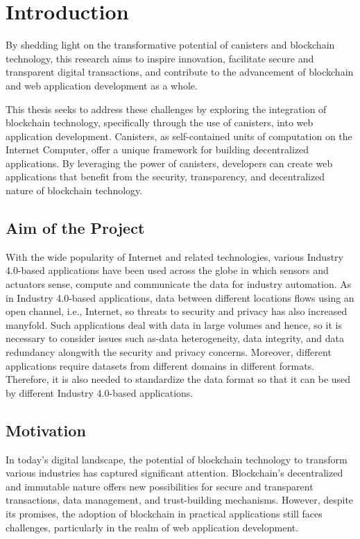\chapter{Introduction}
\label{chap:intro}

By shedding light on the transformative potential of canisters and blockchain technology, this research aims to inspire innovation, facilitate secure and transparent digital transactions, and contribute to the advancement of blockchain and web application development as a whole.

This thesis seeks to address these challenges by exploring the integration of blockchain technology, specifically through the use of canisters, into web application development. Canisters, as self-contained units of computation on the Internet Computer, offer a unique framework for building decentralized applications. By leveraging the power of canisters, developers can create web applications that benefit from the security, transparency, and decentralized nature of blockchain technology.

\section{Aim of the Project} \label{sec:s1}
With the wide popularity of Internet and related technologies, various Industry 4.0-based applications have been used across the globe in which sensors and actuators sense, compute and communicate the data for industry automation. As in Industry 4.0-based applications, data between different locations flows using an open channel, i.e., Internet, so threats to security and privacy has also increased manyfold. Such applications deal with data in large volumes and hence, so it is necessary to consider issues such as-data heterogeneity, data integrity, and data redundancy alongwith the security and privacy concerns. Moreover, different applications require datasets from different domains in different formats. Therefore, it is also needed to standardize the data format so that it can be used by different Industry 4.0-based applications.

\section{Motivation}
In today's digital landscape, the potential of blockchain technology to transform various industries has captured significant attention. Blockchain's decentralized and immutable nature offers new possibilities for secure and transparent transactions, data management, and trust-building mechanisms. However, despite its promises, the adoption of blockchain in practical applications still faces challenges, particularly in the realm of web application development.

